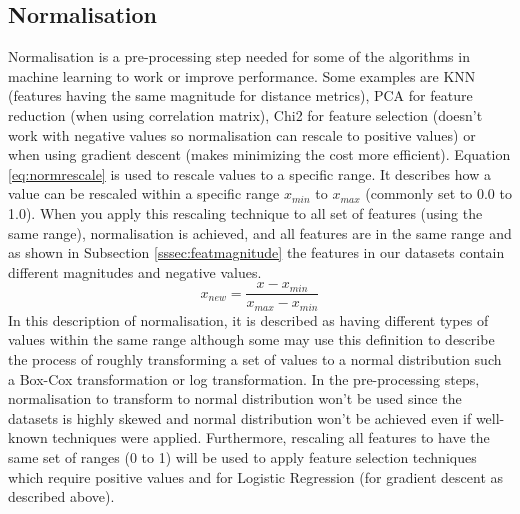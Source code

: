 \subsection{Normalisation}\label{ssec:normalisation}

Normalisation is a pre-processing step needed for some of the algorithms in machine learning to work or improve performance. Some examples are KNN (features having the same magnitude for distance metrics), PCA for feature reduction (when using correlation matrix), Chi2 for feature selection (doesn’t work with negative values so normalisation can rescale to positive values) or when using gradient descent (makes minimizing the cost more efficient). Equation \eqref{eq:normrescale} is used to rescale values to a specific range. It describes how a value can be rescaled within a specific range $x_{min}$ to $x_{max}$ (commonly set to 0.0 to 1.0). When you apply this rescaling technique to all set of features (using the same range), normalisation is achieved, and all features are in the same range and as shown in Subsection \ref{sssec:featmagnitude} the features in our datasets contain different magnitudes and negative values.
\begin{equation} \label{eq:normrescale}
    x_{new} = \frac{x - x_{min}}{x_{max} - x_{min}}
\end{equation}
\noindent In this description of normalisation, it is described as having different types of values within the same range although some may use this definition to describe the process of roughly transforming a set of values to a normal distribution such a Box-Cox transformation \cite{box1964analysis} or log transformation. In the pre-processing steps, normalisation to transform to normal distribution won’t be used since the datasets is highly skewed and normal distribution won’t be achieved even if well-known techniques were applied. Furthermore, rescaling all features to have the same set of ranges (0 to 1) will be used to apply feature selection techniques which require positive values and for Logistic Regression (for gradient descent as described above).                

